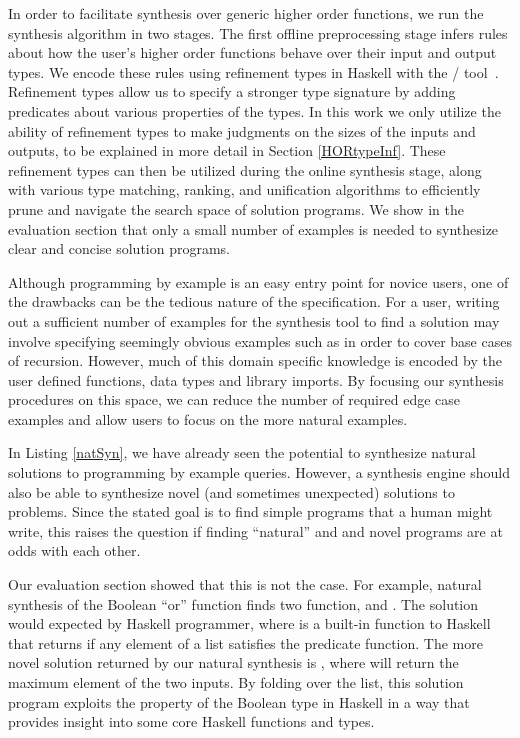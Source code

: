 In order to facilitate synthesis over generic higher order functions, we run the synthesis algorithm in two stages. The first offline preprocessing stage infers rules about how the user's higher order functions behave over their input and output types. We encode these rules using refinement types in Haskell with the \lhask/ tool~\cite{DBLP:conf/haskell/VazouSJ14}. Refinement types allow us to specify a stronger type signature by adding predicates about various properties of the types. In this work we only utilize the ability of refinement types to make judgments on the sizes of the inputs and outputs, to be explained in more detail in Section \ref{HORtypeInf}. These refinement types can then be utilized during the online synthesis stage, along with various type matching, ranking, and unification algorithms to efficiently prune and navigate the search space of solution programs. We show in the evaluation section that only a small number of examples is needed to synthesize clear and concise solution programs.

Although programming by example is an easy entry point for novice
users, one of the drawbacks can be the tedious nature of the
specification. For a user, writing out a sufficient number of
examples for the synthesis tool to find a solution may involve
specifying seemingly obvious examples such as \codeinline{[]->[]} in order to cover base cases of recursion.  However, much of this domain specific knowledge is encoded by the user defined functions, data types and library imports. By focusing our synthesis procedures on this space, we can reduce the number of required edge case examples and allow users to focus on the more natural examples.

In Listing \ref{natSyn}, we have already seen the potential to synthesize natural solutions to programming by example queries.
However, a synthesis engine should also be able to synthesize novel (and sometimes unexpected) solutions to problems. 
Since the stated goal is to find simple programs that a human might write, this raises the question if finding ``natural'' and and novel programs are at odds with each other.


Our evaluation section showed that this is not the case.
For example, natural synthesis of the Boolean ``or'' function finds two function,  and . The  solution would expected by Haskell programmer, where  is a built-in function to Haskell that returns  if any element of a list satisfies the predicate function.  The more novel solution returned by our natural synthesis is , where  will return the maximum element of the two inputs. By folding over the list, this solution program exploits the  property of the Boolean type in Haskell in a way that provides insight into some core Haskell functions and types.

